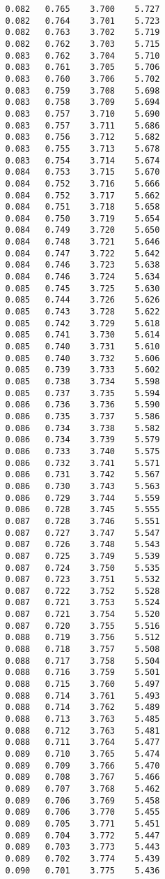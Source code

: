 \begin{verbatim}
   0.082   0.765    3.700    5.727
   0.082   0.764    3.701    5.723
   0.082   0.763    3.702    5.719
   0.082   0.762    3.703    5.715
   0.083   0.762    3.704    5.710
   0.083   0.761    3.705    5.706
   0.083   0.760    3.706    5.702
   0.083   0.759    3.708    5.698
   0.083   0.758    3.709    5.694
   0.083   0.757    3.710    5.690
   0.083   0.757    3.711    5.686
   0.083   0.756    3.712    5.682
   0.083   0.755    3.713    5.678
   0.083   0.754    3.714    5.674
   0.084   0.753    3.715    5.670
   0.084   0.752    3.716    5.666
   0.084   0.752    3.717    5.662
   0.084   0.751    3.718    5.658
   0.084   0.750    3.719    5.654
   0.084   0.749    3.720    5.650
   0.084   0.748    3.721    5.646
   0.084   0.747    3.722    5.642
   0.084   0.746    3.723    5.638
   0.084   0.746    3.724    5.634
   0.085   0.745    3.725    5.630
   0.085   0.744    3.726    5.626
   0.085   0.743    3.728    5.622
   0.085   0.742    3.729    5.618
   0.085   0.741    3.730    5.614
   0.085   0.740    3.731    5.610
   0.085   0.740    3.732    5.606
   0.085   0.739    3.733    5.602
   0.085   0.738    3.734    5.598
   0.085   0.737    3.735    5.594
   0.086   0.736    3.736    5.590
   0.086   0.735    3.737    5.586
   0.086   0.734    3.738    5.582
   0.086   0.734    3.739    5.579
   0.086   0.733    3.740    5.575
   0.086   0.732    3.741    5.571
   0.086   0.731    3.742    5.567
   0.086   0.730    3.743    5.563
   0.086   0.729    3.744    5.559
   0.086   0.728    3.745    5.555
   0.087   0.728    3.746    5.551
   0.087   0.727    3.747    5.547
   0.087   0.726    3.748    5.543
   0.087   0.725    3.749    5.539
   0.087   0.724    3.750    5.535
   0.087   0.723    3.751    5.532
   0.087   0.722    3.752    5.528
   0.087   0.721    3.753    5.524
   0.087   0.721    3.754    5.520
   0.087   0.720    3.755    5.516
   0.088   0.719    3.756    5.512
   0.088   0.718    3.757    5.508
   0.088   0.717    3.758    5.504
   0.088   0.716    3.759    5.501
   0.088   0.715    3.760    5.497
   0.088   0.714    3.761    5.493
   0.088   0.714    3.762    5.489
   0.088   0.713    3.763    5.485
   0.088   0.712    3.763    5.481
   0.088   0.711    3.764    5.477
   0.089   0.710    3.765    5.474
   0.089   0.709    3.766    5.470
   0.089   0.708    3.767    5.466
   0.089   0.707    3.768    5.462
   0.089   0.706    3.769    5.458
   0.089   0.706    3.770    5.455
   0.089   0.705    3.771    5.451
   0.089   0.704    3.772    5.447
   0.089   0.703    3.773    5.443
   0.089   0.702    3.774    5.439
   0.090   0.701    3.775    5.436

\end{verbatim}
